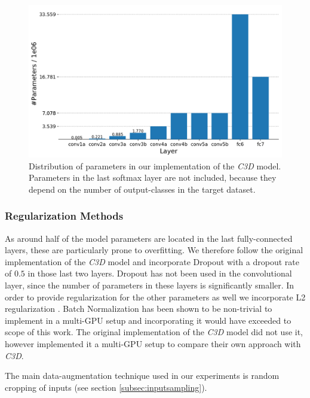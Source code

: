 \begin{figure}[H]
    \centering
    \includegraphics[width=\textwidth]{img_approach/parameters_plot}
    \caption{Distribution of parameters in our implementation of the \textit{C3D} model. Parameters in the last softmax layer are not included, because they depend on the number of output-classes in the target dataset.}
    \label{fig:parameters_plot}
\end{figure}


\subsubsection{Regularization Methods}
As around half of the model parameters are located in the last fully-connected layers, these are particularly prone to overfitting.
We therefore follow the original implementation of the \textit{C3D} model and incorporate Dropout\cite{srivastava_dropout:_2014} with a dropout rate of $0.5$ in those last two layers. 
Dropout has not been used in the convolutional layer, since the number of parameters in these layers is significantly smaller.
In order to provide regularization for the other parameters as well we incorporate L2 regularization \cite{ng_feature_2004}.
Batch Normalization \cite{ioffe_batch_2015-2} has been shown to be non-trivial to implement in a multi-GPU setup and incorporating it would have exceeded to scope of this work.
The original implementation of the \textit{C3D} model did not use it, \textcite{carreira_quo_2017} however implemented it a multi-GPU setup to compare their own approach with \textit{C3D}.

The main data-augmentation technique used in our experiments is random cropping of inputs (see section \ref{subsec:inputsampling}).



